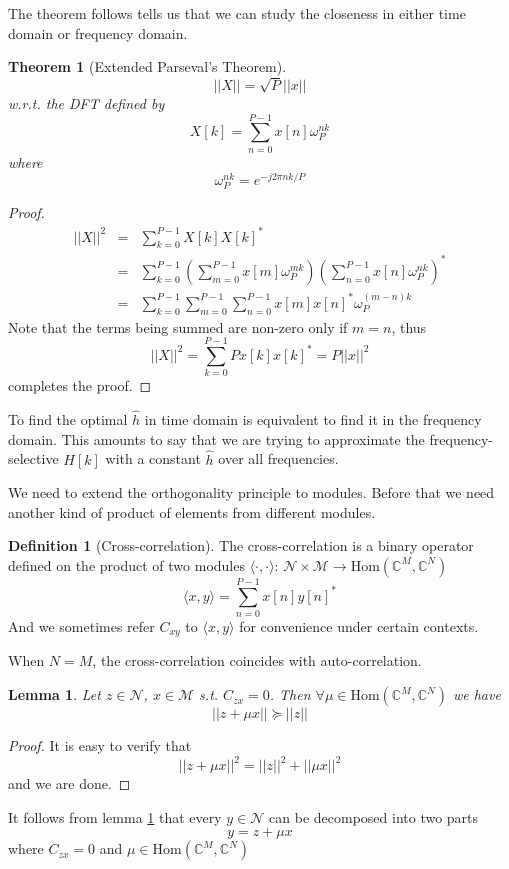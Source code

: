 \documentclass[12pt]{article}
\newtheorem{lemma}{Lemma}
\newtheorem{theorem}{Theorem}
\theoremstyle{definition}
\newtheorem{definition}{Definition}
\begin{document}
The theorem follows tells us that we can study the closeness in either time domain or frequency domain.
\begin{theorem}[Extended Parseval's Theorem]\label{thm parseval}
	$$||X||=\sqrt{P}||x||$$
	w.r.t. the DFT defined by
	$$X[k]=\sum_{n=0}^{P-1}x[n]\omega_P^{nk}$$
	where
	$$\omega_P^{nk}=e^{-j2\pi nk/P}$$
\end{theorem}
\begin{proof}
	\begin{eqnarray*}
	||X||^2&=&\sum_{k=0}^{P-1}X[k]X[k]^*\\
	&=&\sum_{k=0}^{P-1}\left(\sum_{m=0}^{P-1}x[m]\omega_P^{mk} \right)\left(\sum_{n=0}^{P-1}x[n]\omega_P^{nk} \right)^*\\
	&=&\sum_{k=0}^{P-1}\sum_{m=0}^{P-1}\sum_{n=0}^{P-1}x[m]x[n]^*\omega_P^{(m-n)k}
	\end{eqnarray*}
Note that the terms being summed are non-zero only if $m=n$, thus
$$||X||^2=\sum_{k=0}^{P-1}Px[k]x[k]^*=P||x||^2$$
completes the proof.
\end{proof}
To find the optimal $\hat{h}$ in time domain is equivalent to find it in the frequency domain. This amounts to say that we are trying to approximate the frequency-selective $H[k]$ with a constant $\hat{h}$ over all frequencies.

We need to extend the orthogonality principle to modules. Before that we need another kind of product of elements from different modules.
\begin{definition}[Cross-correlation]\label{def crosscorrelation}
	The cross-correlation is a binary operator defined on the product of two modules $\langle\cdot,\cdot\rangle$: $\mathcal{N}\times \mathcal{M}\rightarrow\mbox{Hom}\left(\mathbb{C}^M,\mathbb{C}^N \right)$
	$$\langle x,y\rangle=\sum_{n=0}^{P-1}x[n]y[n]^*$$
	And we sometimes refer $C_{xy}$ to $\langle x,y\rangle$ for convenience under certain contexts.
\end{definition}
When $N=M$, the cross-correlation coincides with auto-correlation.
\begin{lemma}\label{lemma |z+mux|>=|z|}
	Let $z\in\mathcal{N}$, $x\in\mathcal{M}$ s.t. $C_{zx}=0$. Then $\forall \mu\in\mbox{Hom}\left(\mathbb{C}^M,\mathbb{C}^N \right)$ we have
	$$||z+\mu x||\succeq||z||$$
\end{lemma}
\begin{proof}
	It is easy to verify that
	$$||z+\mu x||^2=||z||^2+||\mu x||^2$$
	and we are done.
\end{proof}
It follows from lemma \ref{lemma |z+mux|>=|z|} that every $y\in\mathcal{N}$ can be decomposed into two parts
$$y=z+\mu x$$
where $C_{zx}=0$ and $\mu\in\mbox{Hom}\left(\mathbb{C}^M, \mathbb{C}^N\right)$
\end{document}
